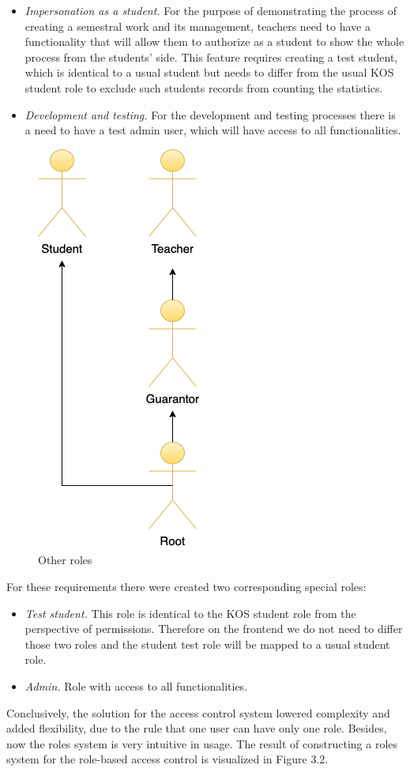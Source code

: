 \begin{itemize}
    \item \emph{Impersonation as a student.} For the purpose of demonstrating the process of creating a semestral work and its management, teachers need to have a functionality that will allow them to authorize as a student to show the whole process from the students' side. This feature requires creating a test student, which is identical to a usual student but needs  to differ from the usual KOS student role to exclude such students records from counting the statistics. 
    \item \emph{Development and testing.} For the development and testing processes there is a need to have a test admin user, which will have access to all functionalities. 
\end{itemize}

\begin{figure}[h]
\centering
\includegraphics[scale=0.54]{../png/roles.png}
\caption{Other roles}\label{picture:special_roles}
\end{figure}


\noindent For these requirements there were created two corresponding special roles:

\begin{itemize}
    \item \emph{Test student.} This role is identical to the KOS student role from the perspective of permissions. Therefore on the frontend we do not need to differ those two roles and the student test role will be mapped to a usual student role.
    \item \emph{Admin.} Role with access to all functionalities.
\end{itemize}

\noindent Conclusively, the solution for the access control system lowered complexity and added flexibility, due to the rule that one user can have only one role. Besides, now the roles system is very intuitive in usage. The result of constructing a roles system for the role-based access control is visualized in Figure 3.2.
